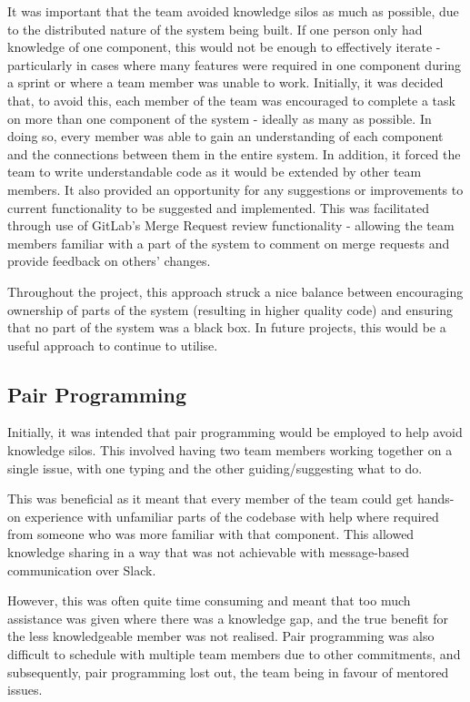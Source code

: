 \documentclass{l3proj}
\begin{document}
It was important that the team avoided knowledge silos as much as possible, due to the distributed nature of the system being built. If one person only had knowledge of one component, this would not be enough to effectively iterate - particularly in cases where many features were required in one component during a sprint or where a team member was unable to work. Initially, it was decided that, to avoid this, each member of the team was encouraged to complete a task on more than one component of the system - ideally as many as possible. In doing so, every member was able to gain an understanding of each component and the connections between them in the entire system. In addition, it forced the team to write understandable code as it would be extended by other team members. It also provided an opportunity for any suggestions or improvements to current functionality to be suggested and implemented. This was facilitated through use of GitLab's Merge Request review functionality - allowing the team members familiar with a part of the system to comment on merge requests and provide feedback on others' changes.

Throughout the project, this approach struck a nice balance between encouraging ownership of parts of the system (resulting in higher quality code) and ensuring that no part of the system was a black box. In future projects, this would be a useful approach to continue to utilise.

\subsection{Pair Programming}
Initially, it was intended that pair programming \cite{pair-programming} would be employed to help avoid knowledge silos. This involved having two team members working together on a single issue, with one typing and the other guiding/suggesting what to do.

This was beneficial as it meant that every member of the team could get hands-on experience with unfamiliar parts of the codebase with help where required from someone who was more familiar with that component. This allowed knowledge sharing in a way that was not achievable with message-based communication over Slack.

However, this was often quite time consuming and meant that too much assistance was given where there was a knowledge gap, and the true benefit for the less knowledgeable member was not realised. Pair programming was also difficult to schedule with multiple team members due to other commitments, and subsequently, pair programming lost out, the team being in favour of mentored issues.
\end{document}
